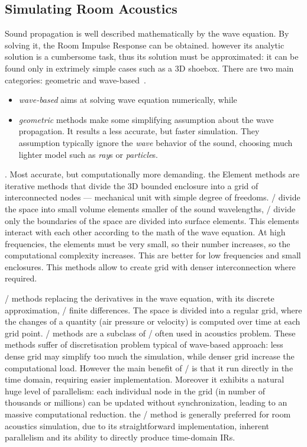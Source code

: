 \subsection{Simulating Room Acoustics}
Sound propagation is well described mathematically by the wave equation.
By solving it, the Room Impulse Response can be obtained.
however its analytic solution is a cumbersome task, thus its solution must be approximated: it can be found only in extrimely
simple cases such as a 3D shoebox.
There are two main categories: geometric and wave-based~\cite{habets2010generator, reuk.github.io, Savioja2015goemetric}.
\begin{itemize}
    \item \textit{wave-based} aims at solving wave equation numerically, while
    \item \textit{geometric} methods make some simplifying assumption about the wave propagation.
    It results a less accurate, but faster simulation.
    They assumption typically ignore the \textit{wave} behavior of the sound, choosing much lighter model such as \textit{ray}s or \textit{particle}s.
\end{itemize}

.
Most accurate, but computationally more demanding.
the Element methods are iterative methods that divide the 3D bounded enclosure into a grid of interconnected nodes --- mechanical unit with simple degree of freedoms.
\FEMf/ divide the space into small volume elements smaller of the sound wavelengths,
\BEMf/ divide only the boundaries of the space are divided into surface elements.
This elements interact with each other according to the math of the wave equation.
At high frequencies, the elements must be very small, so their number increases, so the computational complexity increases.
This are better for low frequencies and small enclosures.
This methods allow to create grid with denser interconnection where required.

\FDTDf/ methods replacing the derivatives in the wave equation, with its discrete approximation, \ie/ finite differences.
The space is divided into a regular grid, where the changes of a quantity (air pressure or velocity) is computed over time at each grid point.
\DWMf/ methods are a subclass of \FDTD/ often used in acoustics problem.
These methods suffer of discretisation problem typical of wave-based approach:
less dense grid may simplify too much the simulation, while denser grid increase the computational load.
However the main benefit of \FDTD/ is that it run directly in the time domain, requiring easier implementation.
Moreover it exhibits a natural huge level of parallelism: each individual node in the grid (in number of thousands or millions) can be updated without synchronization, leading to an massive computational reduction.
the \FDTD/ method is generally preferred for room acoustics simulation\cite{Valimaki2012fifty},
due to its straightforward implementation, inherent parallelism and its ability to directly produce time-domain IRs.

